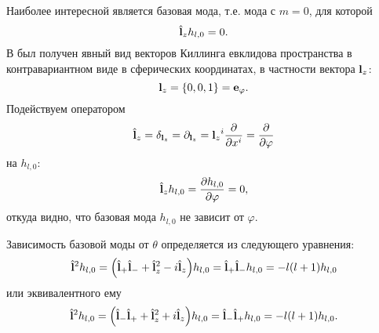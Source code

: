 \documentclass[12pt,a4paper]{article}
\begin{document}
        Наиболее интересной является базовая мода, т.е. мода с $m = 0$, для которой
        \begin{equation}
            \hat{\mathbf{l}}_z h_{l, 0} = 0 .
        \end{equation}
        В \cite{math_appendix} был получен явный вид векторов Киллинга евклидова пространства в контравариантном виде в сферических координатах, в частности вектора $\mathbf{l}_z$:
        \begin{equation}
            \mathbf{l}_z = \qty{ 0, 0, 1 } = \mathbf{e}_\varphi .
        \end{equation}
        Подействуем оператором\footnotemark
        \begin{equation}
            \hat{\mathbf{l}}_z
                = \delta_{\mathbf{l}_z}
                = \partial_{\mathbf{l}_z}
                = {\mathbf{l}_z}^i \pdv{x^i}
                = \pdv{\varphi}
        \end{equation}
        на $h_{l, 0}$:
        \begin{equation}
            \hat{\mathbf{l}}_z h_{l, 0} = \pdv{h_{l, 0}}{\varphi} = 0 ,
        \end{equation}
        откуда видно, что базовая мода $h_{l, 0}$ не зависит от $\varphi$.


        Зависимость базовой моды от $\theta$ определяется из следующего уравнения:
        \begin{equation}\label{eq:basemode_op_eq}
            \hat{\mathbf{l}}^2 h_{l, 0}
                = \qty( \hat{\mathbf{l}}_{+} \hat{\mathbf{l}}_{-} + \hat{\mathbf{l}}_z^2 - i \hat{\mathbf{l}}_z ) h_{l, 0}
                = \hat{\mathbf{l}}_{+} \hat{\mathbf{l}}_{-} h_{l, 0}
                = - l (l + 1) h_{l, 0}
        \end{equation}
        или эквивалентного ему
        \begin{equation}
            \hat{\mathbf{l}}^2 h_{l, 0}
                = \qty( \hat{\mathbf{l}}_{-} \hat{\mathbf{l}}_{+} + \hat{\mathbf{l}}_z^2 + i \hat{\mathbf{l}}_z ) h_{l, 0}
                = \hat{\mathbf{l}}_{-} \hat{\mathbf{l}}_{+} h_{l, 0}
                = - l (l + 1) h_{l, 0} .
        \end{equation}
\end{document}
